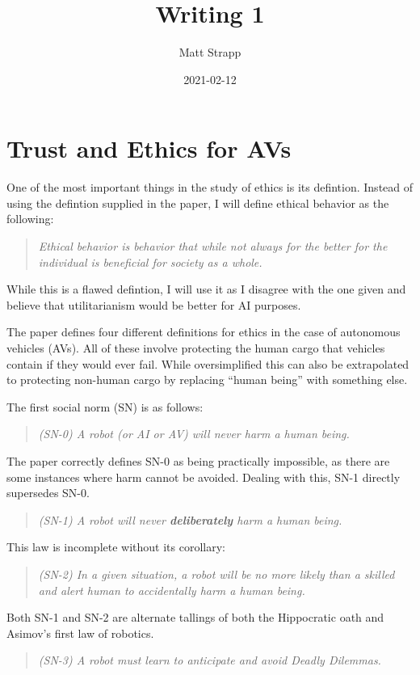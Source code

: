 \documentclass{article}
\title{Writing 1}
\author{Matt Strapp}
\date{2021-02-12}
\begin{document}
   \maketitle
   \section*{Trust and Ethics for AVs}
   One of the most important things in the study of ethics is its defintion.
   Instead of using the defintion supplied in the paper, I will define ethical behavior as the following:   
   \begin{quote}
      \emph{Ethical behavior is behavior that while not always for the better for the individual is beneficial for society as a whole.}
   \end{quote}
   While this is a flawed defintion, I will use it as I disagree with the one given and believe that utilitarianism would be better for AI purposes.


   The paper defines four different definitions for ethics in the case of autonomous vehicles (AVs).
   All of these involve protecting the human cargo that vehicles contain if they would ever fail.
   While oversimplified this can also be extrapolated to protecting non-human cargo by replacing ``human being'' with something else.

   The first social norm (SN) is as follows:
   \begin{quote}
      \emph{(SN-0) A robot (or AI or AV) will never harm a human being.}
   \end{quote}
   The paper correctly defines SN-0 as being practically impossible, as there are some instances where harm cannot be avoided.
   Dealing with this, SN-1 directly supersedes SN-0.
   \begin{quote}
      \emph{(SN-1) A robot will never \textbf{deliberately} harm a human being.}
   \end{quote}
   This law is incomplete without its corollary:
   \begin{quote}
      \emph{(SN-2) In a given situation, a robot will be no more likely than a skilled and alert human to accidentally harm a human being.}
   \end{quote}
   Both SN-1 and SN-2 are alternate tallings of both the Hippocratic oath and Asimov's first law of robotics.
   
   \begin{quote}
      \emph{(SN-3) A robot must learn to anticipate and avoid Deadly Dilemmas.}
   \end{quote}
    
\end{document}
